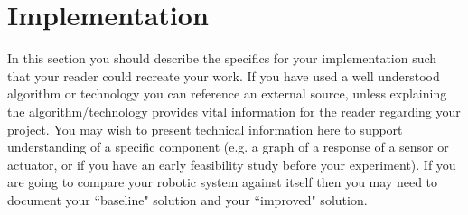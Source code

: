 \documentclass[conference]{IEEEtran}
\begin{document}







\section{Implementation}

In this section you should describe the specifics for your implementation such that your reader could recreate your work.  If you have used a well understood algorithm or technology you can reference an external source, unless explaining the algorithm/technology provides vital information for the reader regarding your project.  You may wish to present technical information here to support understanding of a specific component (e.g. a graph of a response of a sensor or actuator, or if you have an early feasibility study before your experiment).  If you are going to compare your robotic system against itself then you may need to document your ``baseline" solution and your ``improved" solution.  
\end{document}
